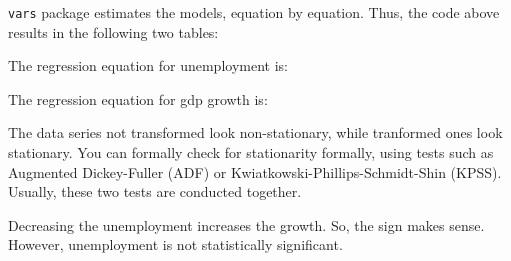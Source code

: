 \begin{sol}
    

    \verb|vars| package estimates the \varp{} models, equation by equation. Thus, the code above results in the following two tables:

    The regression equation for unemployment is:
    

    The regression equation for gdp growth is:
    

    The data series not transformed look non-stationary, while tranformed ones look stationary. You can formally check for stationarity formally, using tests such as Augmented Dickey-Fuller (ADF) or Kwiatkowski-Phillips-Schmidt-Shin (KPSS). Usually, these two tests are conducted together.

    Decreasing the unemployment increases the growth. So, the sign makes sense. However, unemployment is not statistically significant.
\end{sol}